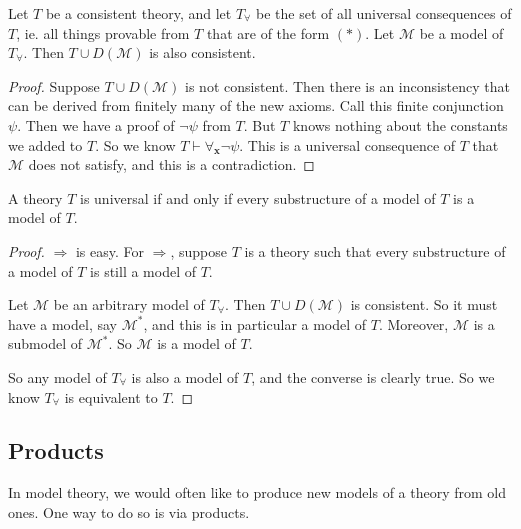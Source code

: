 \documentclass[a4paper]{article}
\begin{document}
\begin{lemma}
  Let $T$ be a consistent theory, and let $T_{\forall}$ be the set of all universal consequences of $T$, ie. all things provable from $T$ that are of the form $(*)$. Let $\mathcal{M}$ be a model of $T_\forall$. Then $T \cup D(\mathcal{M})$ is also consistent.
\end{lemma}

\begin{proof}
  Suppose $T \cup D(\mathcal{M})$ is not consistent. Then there is an inconsistency that can be derived from finitely many of the new axioms. Call this finite conjunction $\psi$. Then we have a proof of $\neg \psi$ from $T$. But $T$ knows nothing about the constants we added to $T$. So we know $T\vdash \forall_{\mathbf{x}} \neg \psi$. This is a universal consequence of $T$ that $\mathcal{M}$ does not satisfy, and this is a contradiction.
\end{proof}

\begin{thm}
  A theory $T$ is universal if and only if every substructure of a model of $T$ is a model of $T$.
\end{thm}

\begin{proof}
  $\Rightarrow$ is easy. For $\Rightarrow$, suppose $T$ is a theory such that every substructure of a model of $T$ is still a model of $T$.

  Let $\mathcal{M}$ be an arbitrary model of $T_\forall$. Then $T \cup D(\mathcal{M})$ is consistent. So it must have a model, say $\mathcal{M}^*$, and this is in particular a model of $T$. Moreover, $\mathcal{M}$ is a submodel of $\mathcal{M}^*$. So $\mathcal{M}$ is a model of $T$.

  So any model of $T_{\forall}$ is also a model of $T$, and the converse is clearly true. So we know $T_{\forall}$ is equivalent to $T$.
\end{proof}

\subsection{Products}
In model theory, we would often like to produce new models of a theory from old ones. One way to do so is via products.
\end{document}

